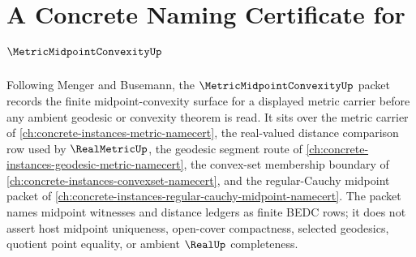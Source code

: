 \chapter{A Concrete Naming Certificate for $\MetricMidpointConvexityUp$}
\label{ch:concrete-instances-metric-midpoint-convexity-namecert}

Following Menger and Busemann, the $\MetricMidpointConvexityUp$ packet records the finite midpoint-convexity surface for a displayed metric carrier before any ambient geodesic or convexity theorem is read. It sits over the metric carrier of \autoref{ch:concrete-instances-metric-namecert}, the real-valued distance comparison row used by $\RealMetricUp$, the geodesic segment route of \autoref{ch:concrete-instances-geodesic-metric-namecert}, the convex-set membership boundary of \autoref{ch:concrete-instances-convexset-namecert}, and the regular-Cauchy midpoint packet of \autoref{ch:concrete-instances-regular-cauchy-midpoint-namecert}. The packet names midpoint witnesses and distance ledgers as finite BEDC rows; it does not assert host midpoint uniqueness, open-cover compactness, selected geodesics, quotient point equality, or ambient $\RealUp$ completeness.

